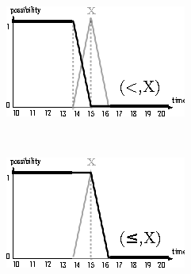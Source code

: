 \documentclass{llncs}
\begin{document}
\begin{figure} 
\centering
\begin{subfigure}[b]{0.3\textwidth}
  \centering
  \includegraphics[width=\textwidth]{graphs/lt.eps}
\end{subfigure}
~
\begin{subfigure}[b]{0.3\textwidth}
  \centering
  \includegraphics[width=\textwidth]{graphs/lte.eps}
\end{subfigure}


\end{figure}
\end{document}
